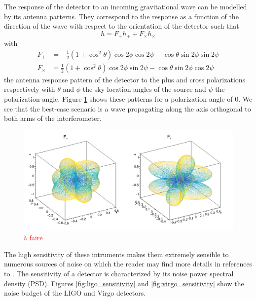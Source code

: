 The response of the detector to an incoming gravitational wave can be modelled by its antenna patterns.
They correspond to the response as a function of the direction of the wave with respect to the orientation of the detector such that
\begin{equation}
  h = F_+ h_+ + F_\times h_\times
\end{equation}
with \cite{antenna_patterns}
\begin{align}
  F_+ &= -\frac{1}{2}(1+\cos^2\theta) \cos 2\phi \cos 2\psi - \cos \theta \sin 2\phi \sin 2 \psi\\
  F_\times &= \frac{1}{2}(1+\cos^2\theta) \cos 2\phi \sin 2\psi - \cos \theta \sin 2\phi \cos 2 \psi
\end{align}
the antenna response pattern of the detector to the plus and cross polarizations respectively with $\theta$ and $\phi$ the sky location angles of the source and $\psi$ the polarization angle.
Figure \ref{fig:antenna_pattern} shows these patterns for a polarization angle of 0.
We see that the best-case scenario is a wave propagating along the axis orthogonal to both arms of the interferometer.
%
\begin{figure}
  \centering
  \includegraphics[width=0.5\linewidth]{sectionDetection/antenna.png}
  \caption{\textcolor{red}{à faire}}
  \label{fig:antenna_pattern}
\end{figure}
%

The high sensitivity of these intruments makes them extremely sensible to numerous sources of noise on which the reader may find more details in references \cite{ligo_characterization} to \cite{prospects}.
The sensitivity of a detector is characterized by its noise power spectral density (PSD).
Figures \ref{fig:ligo_sensitivity} and \ref{fig:virgo_sensitivity} show the noise budget of the LIGO and Virgo detectors.

